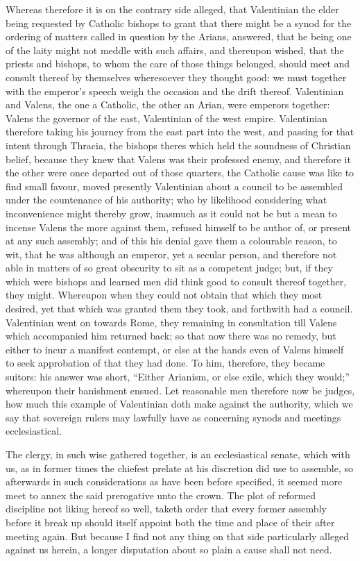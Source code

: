 Whereas therefore it is on the contrary side alleged, that Valentinian the elder being requested by Catholic bishops to grant that there might be a synod for the ordering of matters called in question by the Arians, answered, that he being one of the laity might not meddle with such affairs, and thereupon wished, that the priests and bishops, to whom the care of those things belonged, should meet and consult thereof by themselves wheresoever they thought good: we must together with the emperor’s speech weigh the occasion and the drift thereof. Valentinian and Valens, the one a Catholic, the other an Arian, were emperors together: Valens the governor of the east, Valentinian of the west empire. Valentinian therefore taking his journey from the east part into the west, and passing for that intent through Thracia, the bishops theres which held the soundness of Christian belief, because they knew that Valens was their professed enemy, and therefore it the other were once departed out of those quarters, the Catholic cause was like to find small favour, moved presently Valentinian about a council to be  assembled under the countenance of his authority; who by likelihood considering what inconvenience might thereby grow, inasmuch as it could not be but a mean to incense Valens the more against them, refused himself to be author of, or present at any such assembly; and of this his denial gave them a colourable reason, to wit, that he was although an emperor, yet a secular person, and therefore not able in matters of so great obscurity to sit as a competent judge; but, if they which were bishops and learned men did think good to consult thereof together, they might. Whereupon when they could not obtain that which they most desired, yet that which was granted them they took, and forthwith had a council. Valentinian went on towards Rome, they remaining in consultation till Valens which accompanied him returned back; so that now there was no remedy, but either to incur a manifest contempt, or else at the hands even of Valens himself to seek approbation of that they had done. To him, therefore, they became suitors: his answer was short, “Either Arianism, or else exile, which they would;” whereupon their banishment ensued. Let reasonable men therefore now be judges, how much this example of Valentinian doth make against the authority, which we say that sovereign rulers may lawfully have as concerning synods and meetings ecclesiastical.

The clergy, in such wise gathered together, is an ecclesiastical senate, which with us, as in former times the chiefest prelate at his discretion did use to assemble, so afterwards in such considerations as have been before specified, it seemed more meet to annex the said prerogative unto the crown. The plot of reformed discipline not liking hereof so well, taketh order that every former assembly before it break up should itself appoint both the time and place of their after meeting again. But because I find not any thing on that side particularly alleged against us herein, a longer disputation about so plain a cause shall not need.

